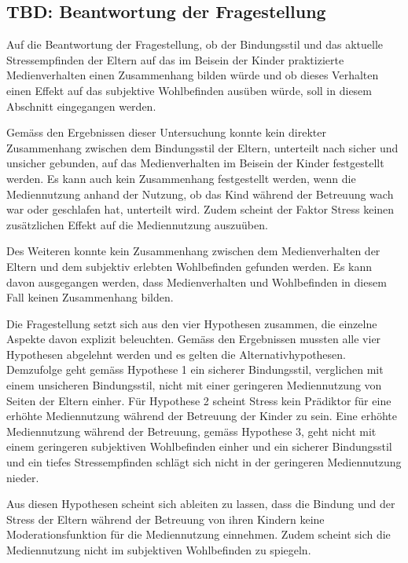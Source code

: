 \subsection{TBD: Beantwortung der Fragestellung} \label{sec:BeantwortungFragestellung}
Auf die Beantwortung der Fragestellung, ob der Bindungsstil und das aktuelle Stressempfinden der Eltern auf das im Beisein der Kinder praktizierte Medienverhalten einen Zusammenhang bilden würde und ob dieses Verhalten einen Effekt auf das subjektive Wohlbefinden ausüben würde, soll in diesem Abschnitt eingegangen werden.

Gemäss den Ergebnissen dieser Untersuchung konnte kein direkter Zusammenhang zwischen dem Bindungsstil der Eltern, unterteilt nach sicher und unsicher gebunden, auf das Medienverhalten im Beisein der Kinder festgestellt werden. Es kann auch kein Zusammenhang festgestellt werden, wenn die Mediennutzung anhand der Nutzung, ob das Kind während der Betreuung wach war oder geschlafen hat, unterteilt wird.  Zudem scheint der Faktor Stress keinen zusätzlichen Effekt auf die Mediennutzung auszuüben.

Des Weiteren konnte kein Zusammenhang zwischen dem Medienverhalten der Eltern und dem subjektiv erlebten Wohlbefinden gefunden werden. Es kann davon ausgegangen werden, dass Medienverhalten und Wohlbefinden in diesem Fall keinen Zusammenhang bilden.

Die Fragestellung setzt sich aus den vier Hypothesen zusammen, die einzelne Aspekte davon explizit beleuchten. Gemäss den Ergebnissen mussten alle vier Hypothesen abgelehnt werden und es gelten die Alternativhypothesen. Demzufolge geht gemäss Hypothese 1 ein sicherer Bindungsstil, verglichen mit einem unsicheren Bindungsstil, nicht mit einer geringeren Mediennutzung von Seiten der Eltern einher. Für Hypothese 2 scheint Stress kein Prädiktor für eine erhöhte Mediennutzung während der Betreuung der Kinder zu sein. Eine erhöhte Mediennutzung während der Betreuung, gemäss Hypothese 3, geht nicht mit einem geringeren subjektiven Wohlbefinden einher und ein sicherer Bindungsstil und ein tiefes Stressempfinden schlägt sich nicht in der geringeren Mediennutzung nieder.

Aus diesen Hypothesen scheint sich ableiten zu lassen, dass die Bindung und der Stress der Eltern während der Betreuung von ihren Kindern keine Moderationsfunktion für die Mediennutzung  einnehmen. Zudem scheint sich die Mediennutzung nicht im subjektiven Wohlbefinden zu spiegeln. 

